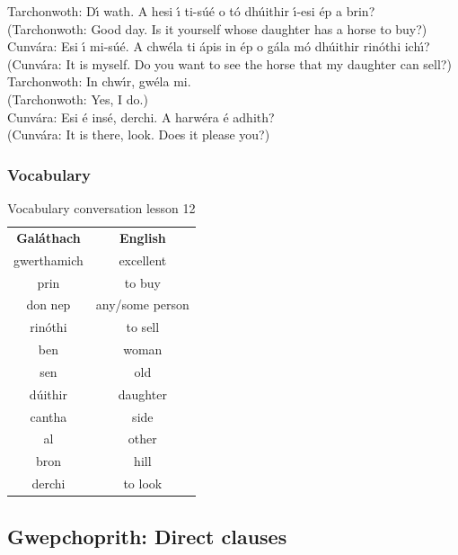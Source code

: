 Tarchonwoth: D\'{\i} wath. A hesi \'{\i} ti-s\'{u}\'{e} o t\'{o} dh\'{u}ithir \'{\i}-esi \'{e}p a brin?\\
(Tarchonwoth: Good day. Is it yourself whose daughter has a horse to buy?)\\

Cunv\'{a}ra: Esi \'{\i} mi-s\'{u}\'{e}. A chw\'{e}la ti \'{a}pis in \'{e}p o g\'{a}la m\'{o} dh\'{u}ithir rin\'{o}thi ich\'{\i}?\\
(Cunv\'{a}ra: It is myself. Do you want to see the horse that my daughter can sell?)\\

Tarchonwoth: In chw\'{\i}r, gw\'{e}la mi.\\
(Tarchonwoth: Yes, I do.)\\

Cunv\'{a}ra: Esi \'{e} ins\'{e}, derchi. A harw\'{e}ra \'{e} adhith?\\
(Cunv\'{a}ra: It is there, look. Does it please you?)\\

\subsubsection{Vocabulary}

\begin{table}[H]
\centering
\begin{tabular}{cc}
  \toprule
  \textbf{Gal\'{a}thach} & \textbf{English}\\
  \cmidrule(lr){1-1}\cmidrule(lr){2-2}
  gwerthamich & excellent\\
  prin & to buy\\
  don nep & any/some person\\
  rin\'{o}thi & to sell\\
  ben & woman\\
  sen & old\\
  d\'{u}ithir & daughter\\
  cantha & side\\
  al & other\\
  bron & hill\\
  derchi & to look\\
  \bottomrule
\end{tabular}
\label{vocab_conversation_lesson12}
\caption{Vocabulary conversation lesson 12}
\end{table}

\subsection{Gwepchoprith: Direct clauses}

